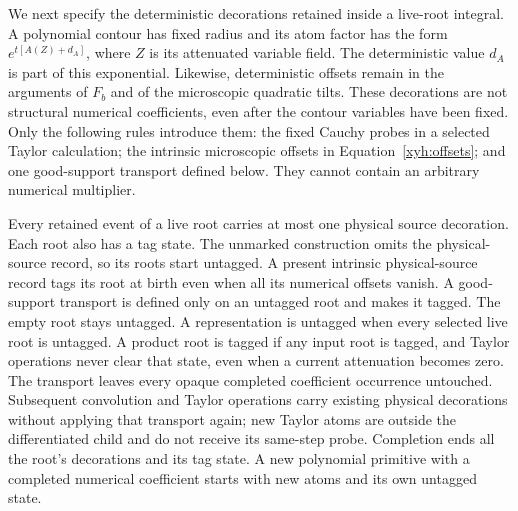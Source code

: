 We next specify the deterministic decorations retained inside a live-root
integral. A polynomial contour has fixed radius and its atom factor has
the form $e^{t[A(Z)+d_A]}$, where $Z$ is its attenuated variable field.
The deterministic value $d_A$ is part of this exponential. Likewise,
deterministic offsets remain in the arguments of $F_b$ and of the
microscopic quadratic tilts. These decorations are not structural
numerical coefficients, even after the contour variables have been fixed.
Only the following rules introduce them: the fixed Cauchy probes in a
selected Taylor calculation; the intrinsic microscopic offsets in
Equation~\eqref{xyh:offsets}; and one good-support transport defined
below. They cannot contain an arbitrary numerical multiplier.

Every retained event of a live root carries at most one physical source
decoration. Each root also has a tag state. The unmarked construction
omits the physical-source record, so its roots start untagged. A present
intrinsic physical-source record tags its root at birth even when all its
numerical offsets vanish. A good-support transport is defined only on an
untagged root and makes it tagged. The
empty root stays untagged. A representation is untagged when every
selected live root is untagged. A product root is tagged if any input root is
tagged, and Taylor operations never clear that state, even when a current
attenuation becomes zero. The transport leaves every opaque completed
coefficient occurrence untouched. Subsequent convolution and Taylor
operations carry existing physical decorations without applying that
transport again; new Taylor atoms are outside the differentiated child
and do not receive its same-step probe. Completion ends all the root's
decorations and its tag state. A new polynomial primitive with a completed
numerical coefficient starts with new atoms and its own untagged state.

